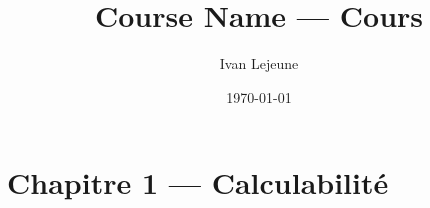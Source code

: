 \documentclass[french,a4paper,10pt]{article}
\title{\color{astral} \sffamily \bfseries Course Name --- Cours}
\author{Ivan Lejeune}
\date{\today}
\begin{document}
    \maketitle
    \tableofcontents
    
    \newpage
    \section*{Chapitre 1 --- Calculabilité}\label{sec:CH1}
    \setcounter{section}{1}
    
\end{document}
